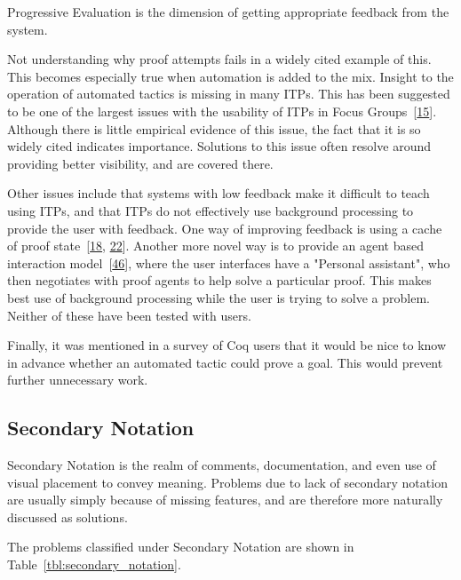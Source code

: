 \documentclass[
]{article}
\begin{document}
Progressive Evaluation is the dimension of getting appropriate feedback
from the system.

Not understanding why proof attempts fails in a widely cited example of
this. This becomes especially true when automation is added to the mix.
Insight to the operation of automated tactics is missing in many ITPs.
This has been suggested to be one of the largest issues with the
usability of ITPs in Focus
Groups~{[}\protect\hyperlink{ref-beckert_usability_2015}{15}{]}.
Although there is little empirical evidence of this issue, the fact that
it is so widely cited indicates importance. Solutions to this issue
often resolve around providing better visibility, and are covered there.

Other issues include that systems with low feedback make it difficult to
teach using ITPs, and that ITPs do not effectively use background
processing to provide the user with feedback. One way of improving
feedback is using a cache of proof
state~{[}\protect\hyperlink{ref-berman_development_2014}{18},
\protect\hyperlink{ref-bourke_challenges_2012}{22}{]}. Another more
novel way is to provide an agent based interaction
model~{[}\protect\hyperlink{ref-hunter_agent-based_2005}{46}{]}, where
the user interfaces have a "Personal assistant", who then negotiates
with proof agents to help solve a particular proof. This makes best use
of background processing while the user is trying to solve a problem.
Neither of these have been tested with users.

Finally, it was mentioned in a survey of Coq users that it would be nice
to know in advance whether an automated tactic could prove a goal. This
would prevent further unnecessary work.

\hypertarget{secondary-notation}{%
\subsection{Secondary Notation}\label{secondary-notation}}

Secondary Notation is the realm of comments, documentation, and even use
of visual placement to convey meaning. Problems due to lack of secondary
notation are usually simply because of missing features, and are
therefore more naturally discussed as solutions.

The problems classified under Secondary Notation are shown in
Table~\ref{tbl:secondary_notation}.
\end{document}
